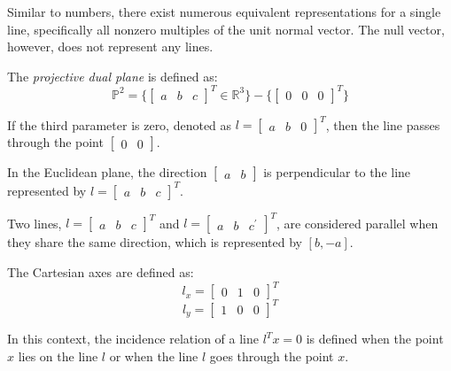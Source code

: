 \documentclass[12pt, a4paper]{report}
\begin{document}
    Similar to numbers, there exist numerous equivalent representations for a single line, specifically all nonzero multiples of the unit normal vector. 
    The null vector, however, does not represent any lines.
    \begin{definition}
        The \emph{projective dual plane} is defined as: 
        \[\mathbb{P}^2=\{{\begin{bmatrix} a & b & c \end{bmatrix}}^T \in \mathbb{R}^3\}-\{{\begin{bmatrix} 0 & 0 & 0 \end{bmatrix}}^T\}\]
    \end{definition}

    \begin{property}
        If the third parameter is zero, denoted as ${l=\begin{bmatrix} a & b & 0 \end{bmatrix}}^T$, then the line passes through the point $\begin{bmatrix} 0 & 0 \end{bmatrix}$. 
    \end{property}
    \begin{property}
        In the Euclidean plane, the direction $\begin{bmatrix} a & b \end{bmatrix}$ is perpendicular to the line represented by ${l=\begin{bmatrix} a & b & c \end{bmatrix}}^T$.
    \end{property}
    \begin{property}
        Two lines, ${l=\begin{bmatrix} a & b & c \end{bmatrix}}^T$ and ${l=\begin{bmatrix} a & b & c^{'} \end{bmatrix}}^T$, are considered parallel when they share the same direction, which is represented by $[b,-a]$.
    \end{property}
    \begin{example}
        The Cartesian axes are defined as: 
        \[l_x={\begin{bmatrix} 0 & 1 & 0 \end{bmatrix}}^T\]
        \[l_y={\begin{bmatrix} 1 & 0 & 0 \end{bmatrix}}^T\]
    \end{example}
    In this context, the incidence relation of a line $l^Tx=0$ is defined when the point $x$ lies on the line $l$ or when the line $l$ goes through the point $x$. 
\end{document}

